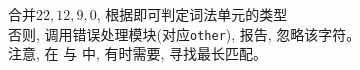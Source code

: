 \begin{frame}{}
  \begin{columns}
      \begin{center}
      \end{center}
      \begin{center}
      \end{center}
  \end{columns}

  \pause
  \vspace{0.30cm}
  \begin{center}
     合并$22, 12, 9, 0$, 根据即可判定词法单元的类型 \\[4pt]
    否则, 调用错误处理模块(对应\texttt{other}), 报告, 忽略该字符。 \\[4pt]
    注意, 在 \floatnum{} 与 \scinum{}中, 有时需要, 寻找最长匹配。
  \end{center}
\end{frame}
